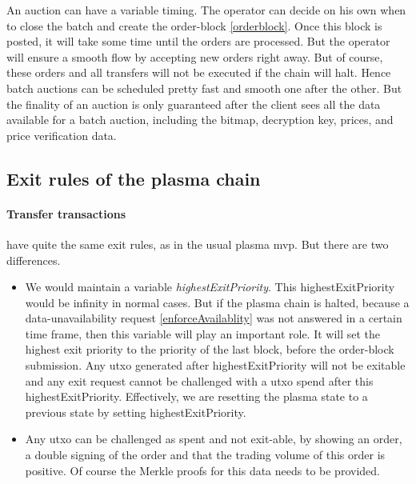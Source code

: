 \documentclass[11pt,parskip=full]{scrartcl}%
\begin{document}
An auction can have a variable timing. 
The operator can decide on his own when to close the batch and create the order-block \ref{orderblock}. 
Once this block is posted, it will take some time until the orders are processed. 
But the operator will ensure a smooth flow by accepting new orders right away. 
But of course, these orders and all transfers will not be executed if the chain will halt. 
Hence batch auctions can be scheduled pretty fast and smooth one after the other. 
But the finality of an auction is only guaranteed after the client sees all the data available for a batch auction, including the bitmap, decryption key, prices, and price verification data. 


\subsection{Exit rules of the plasma chain}
\label{exitRules}
\paragraph{Transfer transactions} have quite the same exit rules, as in the usual plasma mvp. 
But there are two differences.
\begin{itemize}

 \item We would maintain a variable \emph{highestExitPriority}. 
This highestExitPriority would be infinity in normal cases. 
But if the plasma chain is halted, because a data-unavailability request \ref{enforceAvailablity} was not answered in a certain time frame, then this variable will play an important role. 
It will set the highest exit priority to the priority of the last block, before the order-block submission. 
Any utxo generated after highestExitPriority will not be exitable and any exit request cannot be challenged with a utxo spend after this highestExitPriority. 
Effectively, we are resetting the plasma state to a previous state by setting highestExitPriority. 
\item Any utxo can be challenged as spent and not exit-able, by showing an order, a double signing of the order and that the trading volume of this order is positive. Of course the Merkle proofs for this data needs to be provided.

\end{itemize}
\end{document}

